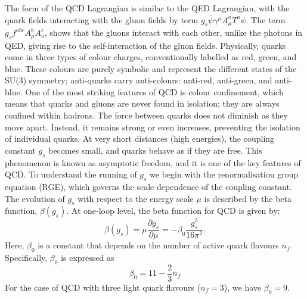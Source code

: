         The form of the QCD Lagrangian is similar to the QED Lagrangian, with the quark 
        fields interacting with the gluon fields by term $g_s \bar{\psi} \gamma^\mu A_\mu^a T^a \psi$.
        The term $g_s f^{abc} A_\mu^b A_\nu^c$, shows that the gluons interact with each other, 
        unlike the photons in QED, giving rise to the self-interaction of the gluon fields.
        Physically, quarks come in three types of colour charges, conventionally labelled as red, 
        green, and blue. These colours are purely symbolic and represent the different states of 
        the SU(3) symmetry; anti-quarks carry anti-colours: anti-red, anti-green, and anti-blue.
        One of the most striking features of QCD is colour confinement, which means that quarks 
        and gluons are never found in isolation; they are always confined within hadrons. 
        The force between quarks does not diminish as they move apart. Instead, it remains 
        strong or even increases, preventing the isolation of individual quarks.
        At very short distances (high energies), the coupling constant $g_s$ becomes small, 
        and quarks behave as if they are free. 
        This phenomenon is known as asymptotic freedom, and it is one of the key features of QCD.
        To understand the running of $g_s$ we begin with the renormalisation group equation (RGE), 
        which governs the scale dependence of the coupling constant. The evolution of $g_s$ with 
        respect to the energy scale $\mu$ is described by the beta function, $\beta(g_s)$. At 
        one-loop level, the beta function for QCD is given by:
        \begin{equation}
            \beta(g_s) = \mu \frac{\partial g_s}{\partial \mu} = - \beta_0 \frac{g_s^3}{16\pi^2}.
        \end{equation}
        Here, $\beta_0$ is a constant that depends on the number of active quark flavours $n_f$. 
        Specifically, $\beta_0$ is expressed as
        \begin{equation}
            \beta_0 = 11 - \frac{2}{3} n_f
        \end{equation}
        For the case of QCD with three light quark flavours ($n_f = 3$), we have $\beta_0 = 9$.

